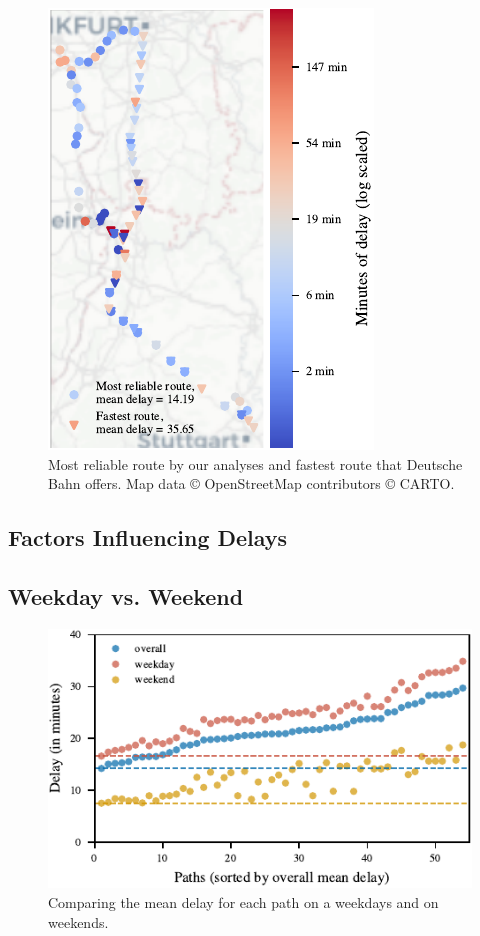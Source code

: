 \documentclass{article}
\theoremstyle{plain}
\theoremstyle{definition}
\theoremstyle{remark}
\begin{document}
\begin{figure} %
\begin{center}
\includegraphics{fig/maps_KI_03_reliable_vs_fastest_zoomed_Carto.pdf} %
\end{center}
\caption{Most reliable route by our analyses and fastest route that Deutsche Bahn offers. Map data © OpenStreetMap contributors © CARTO.}
\end{figure}

\subsection{Factors Influencing Delays}\label{sec:results_ext}

\subsection{Weekday vs. Weekend}
\begin{figure} 
    \includegraphics{fig/plot_FP_03_WeekdayWeekend.pdf}
    \caption{Comparing the mean delay for each path on a weekdays and on weekends.}
\end{figure}
\end{document}
